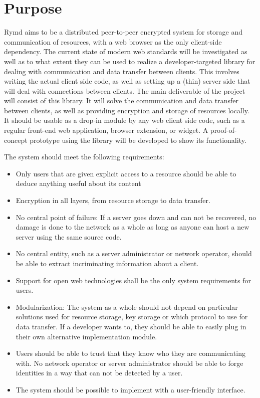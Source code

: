\section{Purpose}
Rymd aims to be a distributed peer-to-peer encrypted system for storage and communication of resources, with a web browser as the only client-side dependency. The current state of modern web standards will be investigated as well as to what extent they can be used to realize a developer-targeted library for dealing with communication and data transfer between clients. This involves writing the actual client side code, as well as setting up a (thin) server side that will deal with connections between clients.
The main deliverable of the project will consist of this library. It will solve the communication and data transfer between clients, as well as providing encryption and storage of resources locally. It should be usable as a drop-in module by any web client side code, such as a regular front-end web application, browser extension, or widget. A proof-of-concept prototype using the library will be developed to show its functionality.

The system should meet the following requirements:
\begin{itemize}
  \item Only users that are given explicit access to a resource should be able to deduce anything useful about its content
  
  
  \item Encryption in all layers, from resource storage to data transfer.
  
  \item No central point of failure: If a server goes down and can not be recovered, no damage is done to the network as a whole as long as anyone can host a new server using the same source code.
  
  \item No central entity, such as a server administrator or network operator, should be able to extract incriminating information about a client.
  
  \item Support for open web technologies shall be the only system requirements for users.

  
  \item Modularization: The system as a whole should not depend on particular solutions used for resource storage, key storage or which protocol to use for data transfer. If a developer wants to, they should be able to easily plug in their own alternative implementation module.

\item Users should be able to trust that they know who they are communicating with. No network operator or server administrator should be able to forge identities in a way that can not be detected by a user.

\item The system should be possible to implement with a user-friendly interface.

\end{itemize}
